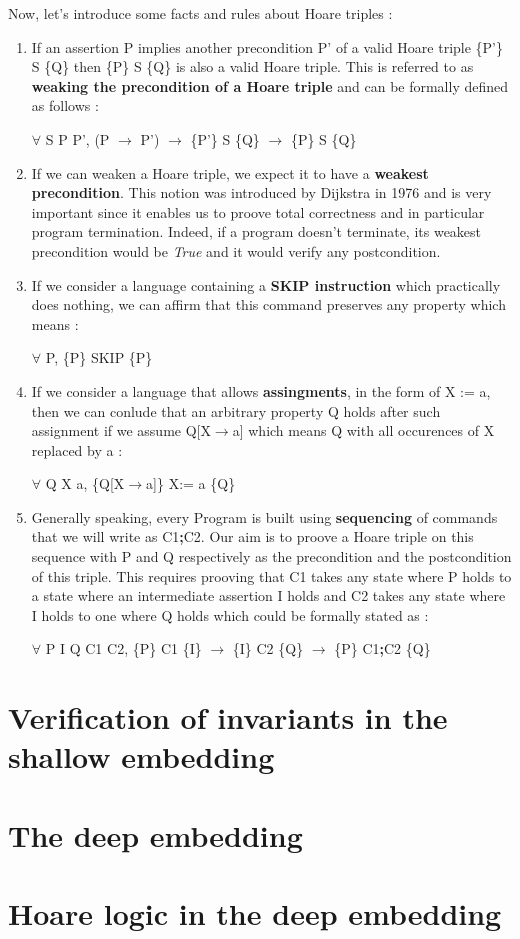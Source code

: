 \pagebreak

\noindent Now, let's introduce some facts and rules about Hoare triples :
\begin{enumerate}
\item If an assertion P implies another precondition P' of a valid Hoare triple \{P'\} S \{Q\} then \{P\} S \{Q\} is also a valid Hoare triple. This is referred to as \textbf{weaking the precondition of a Hoare triple} and can be formally defined as follows :
\begin{center}
$\forall$ S P P', (P $\rightarrow$ P') $\rightarrow$ \{P'\} S \{Q\} $\rightarrow$ \{P\} S \{Q\}
\end{center}
\item If we can weaken a Hoare triple, we expect it to have a \textbf{weakest precondition}. This notion was introduced by Dijkstra in 1976 and is very important since it enables us to proove total correctness and in particular program termination. Indeed, if a program doesn't terminate, its weakest precondition would be \textit{True} and it would verify any postcondition.
\item If we consider a language containing a \textbf{SKIP instruction} which practically does nothing, we can affirm that this command preserves any property which means :
\begin{center}
$\forall$ P, \{P\} SKIP \{P\}
\end{center}
\item If we consider a language that allows \textbf{assingments}, in the form of \linebreak X := a, then we can conlude that an arbitrary property Q holds after such assignment if we assume Q[X$\rightarrow$a] which means Q with all occurences of X replaced by a :
\begin{center}
$\forall$ Q X a, \{Q[X$\rightarrow$a]\} X:= a \{Q\}
\end{center}
\item Generally speaking, every Program is built using \textbf{sequencing} of commands that we will write as C1\textbf{;}C2. Our aim is to proove a Hoare triple on this sequence with P and Q respectively as the precondition and the postcondition of this triple. This requires prooving that C1 takes any state where P holds to a state where an intermediate assertion I holds and C2 takes any state where I holds to one where Q holds  which could be formally stated as :
\begin{center}
$\forall$ P I Q C1 C2, \{P\} C1 \{I\} $\rightarrow$ \{I\} C2 \{Q\} $\rightarrow$
\{P\} C1\textbf{;}C2 \{Q\}
\end{center}

\end{enumerate} 



\section{Verification of invariants in the shallow embedding}

\section{The deep embedding} \label{deep}

\section{Hoare logic in the deep embedding}
